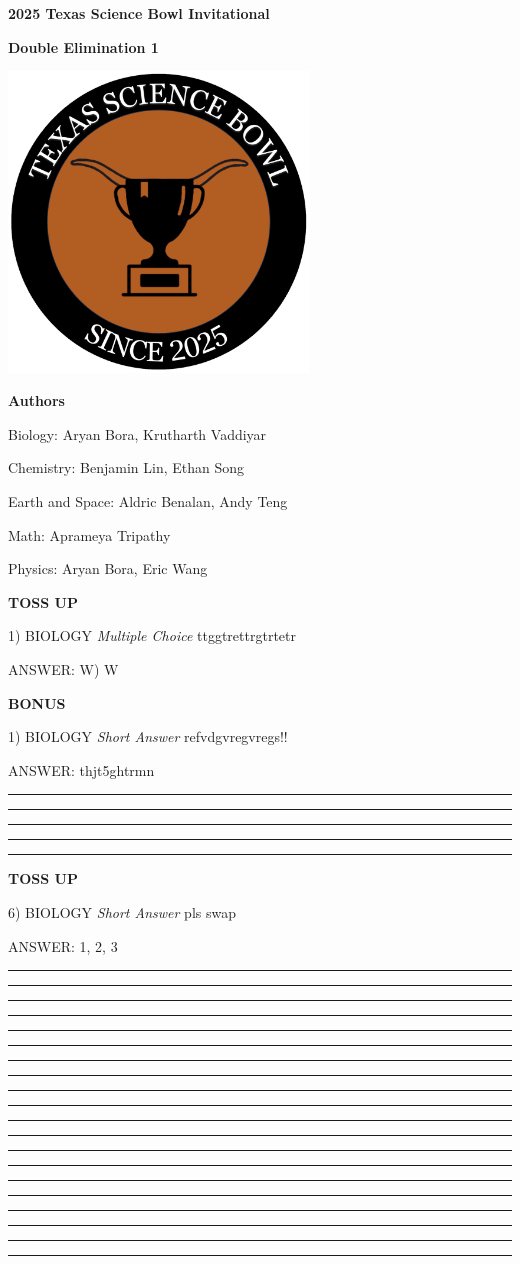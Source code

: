 \documentclass[12pt]{article}
\newcommand{\denumber}{1}
\newcommand{\ts}{TOSS UP}
\newcommand{\bs}{BONUS}
\newcommand{\bi}{BIOLOGY}
\newcommand{\sa}{Short Answer}
\newcommand{\mc}{Multiple Choice}
\newcommand{\sep}{\vspace*{-4mm}
    \rule{\textwidth}{0.1mm}}
\newcommand{\question}[6]
{\begin{center} {\textbf{\MakeUppercase{#2}}}
  \end{center}

  #1)  \MakeUppercase{#3} \textit{#4} \hspace{0.5em} #5
  
  \vspace{5pt}
  ANSWER: #6 \vspace{15pt}}
\begin{document}
\begin{center}

\textbf{{\Huge 2025 Texas Science Bowl Invitational}} 
\vspace{7mm}

\textbf{ {\Large Double Elimination \denumber}}
\vspace{5mm}

\includegraphics[width=3.15in]{tsb_logo.png} 
\vspace{5mm}

\textbf{{\Large Authors}}

Biology: Aryan Bora, Krutharth Vaddiyar

Chemistry: Benjamin Lin, Ethan Song

Earth and Space: Aldric Benalan, Andy Teng

Math: Aprameya Tripathy

Physics: Aryan Bora, Eric Wang

\end{center}
\newpage

\question{1}{\ts}{\bi}{\mc}{ttggtrettrgtrtetr}{W) W}

\question{1}{\bs}{\bi}{\sa}{refvdgvregvregs!!}{thjt5ghtrmn }

\sep

\sep

\sep

\sep

\sep

\question{6}{\ts}{\bi}{\sa}{pls swap}{1, 2, 3}

\sep

\sep

\sep

\sep

\sep

\sep

\sep

\sep

\sep

\sep

\sep

\sep

\sep

\sep

\sep

\sep

\sep

\sep

\sep

\sep
\end{document}
